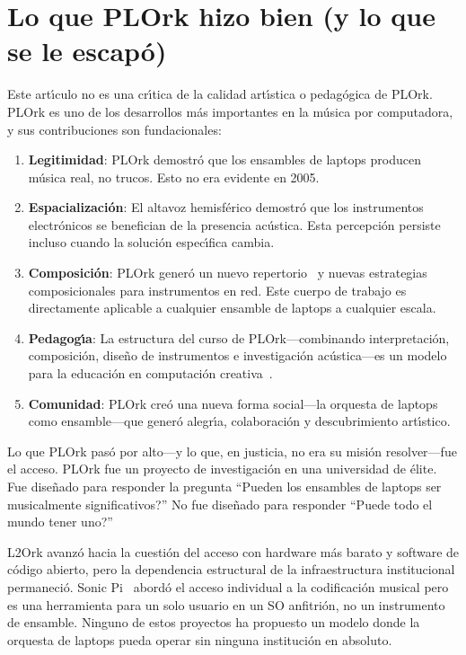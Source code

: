 \documentclass[10pt,letterpaper,twocolumn]{article}
\begin{document}

\section{Lo que PLOrk hizo bien (y lo que se le escap\'{o})}
\label{sec:lessons}

Este art\'{\i}culo no es una cr\'{\i}tica de la calidad art\'{\i}stica o pedag\'{o}gica de PLOrk. PLOrk es uno de los desarrollos m\'{a}s importantes en la m\'{u}sica por computadora, y sus contribuciones son fundacionales:

\begin{enumerate}
  \item \textbf{Legitimidad}: PLOrk demostr\'{o} que los ensambles de laptops producen m\'{u}sica real, no trucos. Esto no era evidente en 2005.
  \item \textbf{Espacializaci\'{o}n}: El altavoz hemisf\'{e}rico demostr\'{o} que los instrumentos electr\'{o}nicos se benefician de la presencia ac\'{u}stica. Esta percepci\'{o}n persiste incluso cuando la soluci\'{o}n espec\'{\i}fica cambia.
  \item \textbf{Composici\'{o}n}: PLOrk gener\'{o} un nuevo repertorio~\citep{smallwood2008composing} y nuevas estrategias composicionales para instrumentos en red. Este cuerpo de trabajo es directamente aplicable a cualquier ensamble de laptops a cualquier escala.
  \item \textbf{Pedagog\'{\i}a}: La estructura del curso de PLOrk---combinando interpretaci\'{o}n, composici\'{o}n, dise\~{n}o de instrumentos e investigaci\'{o}n ac\'{u}stica---es un modelo para la educaci\'{o}n en computaci\'{o}n creativa~\citep{trueman2007why}.
  \item \textbf{Comunidad}: PLOrk cre\'{o} una nueva forma social---la orquesta de laptops como ensamble---que gener\'{o} alegr\'{\i}a, colaboraci\'{o}n y descubrimiento art\'{\i}stico.
\end{enumerate}

Lo que PLOrk pas\'{o} por alto---y lo que, en justicia, no era su misi\'{o}n resolver---fue el acceso. PLOrk fue un proyecto de investigaci\'{o}n en una universidad de \'{e}lite. Fue dise\~{n}ado para responder la pregunta ``\textquestiondown Pueden los ensambles de laptops ser musicalmente significativos?'' No fue dise\~{n}ado para responder ``\textquestiondown Puede todo el mundo tener uno?''

L2Ork avanz\'{o} hacia la cuesti\'{o}n del acceso con hardware m\'{a}s barato y software de c\'{o}digo abierto, pero la dependencia estructural de la infraestructura institucional permaneci\'{o}. Sonic Pi~\citep{aaron2016sonic} abord\'{o} el acceso individual a la codificaci\'{o}n musical pero es una herramienta para un solo usuario en un SO anfitri\'{o}n, no un instrumento de ensamble. Ninguno de estos proyectos ha propuesto un modelo donde la orquesta de laptops pueda operar sin ninguna instituci\'{o}n en absoluto.
\end{document}
